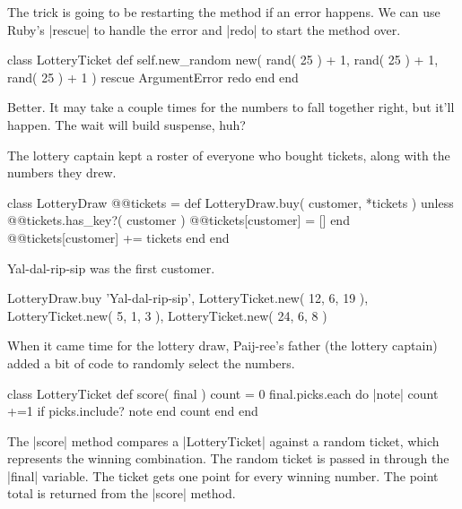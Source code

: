 \documentclass[12pt,twoside]{report}
\begin{document}
The trick is going to be restarting the method if an error happens. We
can use Ruby's \rubyinline|rescue| to handle the error
and \rubyinline|redo| to start the method over.


\begin{rubycode}

 class LotteryTicket
   def self.new_random
     new( rand( 25 ) + 1, rand( 25 ) + 1, rand( 25 ) + 1 )
   rescue ArgumentError
     redo
   end
 end

\end{rubycode}


Better.  It may take a couple times for the numbers to fall together
right, but it'll happen.  The wait will build suspense, huh?

The lottery captain kept a roster of everyone who bought tickets,
along with the numbers they drew.


\begin{rubycode}

 class LotteryDraw
   @@tickets = {}
   def LotteryDraw.buy( customer, *tickets )
     unless @@tickets.has_key?( customer )
       @@tickets[customer] = []
     end
     @@tickets[customer] += tickets
   end
 end

\end{rubycode}


Yal-dal-rip-sip was the first customer.


\begin{rubycode}

 LotteryDraw.buy 'Yal-dal-rip-sip',
     LotteryTicket.new( 12, 6, 19 ),
     LotteryTicket.new( 5, 1, 3 ),
     LotteryTicket.new( 24, 6, 8 )

\end{rubycode}


When it came time for the lottery draw, Paij-ree's father (the lottery
captain) added a bit of code to randomly select the numbers.


\begin{rubycode}

 class LotteryTicket
   def score( final )
     count = 0
     final.picks.each do |note|
       count +=1 if picks.include? note
     end
     count
   end
 end

\end{rubycode}


The \rubyinline|score| method compares a
\rubyinline|LotteryTicket| against a random ticket,
which represents the winning combination.  The random ticket is passed
in through the \rubyinline|final| variable.  The
ticket gets one point for every winning number.  The point total is
returned from the \rubyinline|score| method.
\end{document}
